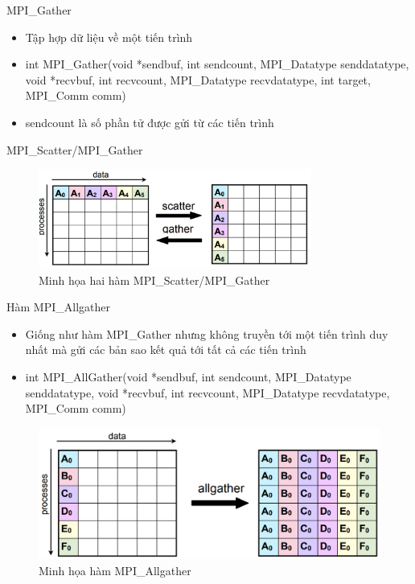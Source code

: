 \documentclass[10pt]{beamer}
\theoremstyle{remark}
\numberwithin{algocf}{section}
\numberwithin{equation}{section}
\numberwithin{dl}{section}
\numberwithin{figure}{section}
\begin{document}
\begin{frame}{MPI\_Gather}
    \begin{itemize}
        \item Tập hợp dữ liệu về một tiến trình
        \item int MPI\_Gather(void *sendbuf, int sendcount,
                             MPI\_Datatype senddatatype, void *recvbuf,
                             int recvcount, MPI\_Datatype recvdatatype,
                             int target, MPI\_Comm comm)
        \item sendcount là số phần tử được gửi từ các tiến trình
    \end{itemize}
\end{frame}

\begin{frame}{MPI\_Scatter/MPI\_Gather}
    \begin{figure}[H]
        \centering
        \includegraphics[width=0.8\textwidth]{figures/MPI/Scatter_Gather.png}
        \caption{Minh họa hai hàm MPI\_Scatter/MPI\_Gather}
    \end{figure}
\end{frame}

\begin{frame}{Hàm MPI\_Allgather}
    \begin{itemize}
        \item Giống như hàm MPI\_Gather nhưng không truyền tới một tiến trình duy nhất mà gửi các bản sao kết quả tới tất cả các tiến trình
        \item int MPI\_AllGather(void *sendbuf, int sendcount,
                                MPI\_Datatype senddatatype, void *recvbuf,
                                int recvcount, MPI\_Datatype recvdatatype,
                                MPI\_Comm comm)
    \end{itemize}
    \begin{figure}[H]
        \centering
        \includegraphics[height=0.45\textheight]{figures/MPI/Allgather.png}
        \caption{Minh họa hàm MPI\_Allgather}
    \end{figure}
\end{frame}
\end{document}
